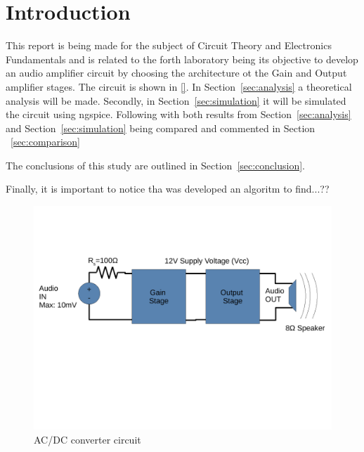 \section{Introduction}
\label{sec:introduction}


\hspace{0,5cm} This report is being made for the subject of Circuit Theory and Electronics Fundamentals and is related to the forth laboratory being its objective to develop an audio amplifier circuit by choosing the architecture ot the Gain and Output amplifier stages.
The circuit is shown in \ref{}.
In Section~\ref{sec:analysis} a theoretical analysis will be made. Secondly, in Section~\ref{sec:simulation} it will be simulated the circuit using ngspice. Following with both results from Section~\ref{sec:analysis} and Section~\ref{sec:simulation} being compared and commented in Section ~\ref{sec:comparison}
\par The conclusions of this study are outlined in Section~\ref{sec:conclusion}.
\par Finally, it is important to notice tha was developed an algoritm to find...??

\begin{figure}[H] \centering
\includegraphics[width=1\linewidth]{circuito.pdf}
\caption{AC/DC converter circuit}
\label{fig:circuito}
\end{figure}


